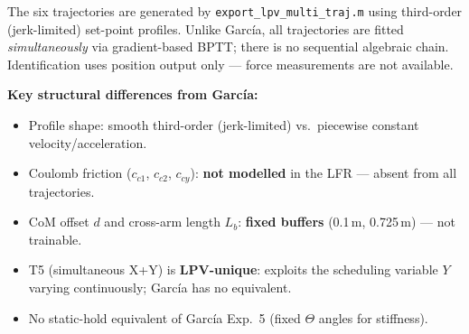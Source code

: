 \documentclass[a4paper, 11pt]{article}
\begin{document}
The six trajectories are generated by \texttt{export\_lpv\_multi\_traj.m} using
third-order (jerk-limited) set-point profiles. Unlike Garc\'{i}a, all trajectories
are fitted \emph{simultaneously} via gradient-based BPTT; there is no sequential
algebraic chain. Identification uses position output only --- force measurements
are not available.

\medskip
\noindent\textbf{Key structural differences from Garc\'{i}a:}
\begin{itemize}
    \item Profile shape: smooth third-order (jerk-limited) vs.\ piecewise constant velocity/acceleration.
    \item Coulomb friction ($c_{c1}$, $c_{c2}$, $c_{cy}$): \textbf{not modelled} in the LFR --- absent from all trajectories.
    \item CoM offset $d$ and cross-arm length $L_b$: \textbf{fixed buffers} (0.1\,m, 0.725\,m) --- not trainable.
    \item T5 (simultaneous X+Y) is \textbf{LPV-unique}: exploits the scheduling variable $Y$ varying
          continuously; Garc\'{i}a has no equivalent.
    \item No static-hold equivalent of Garc\'{i}a Exp.~5 (fixed $\Theta$ angles for stiffness).
\end{itemize}
\end{document}
